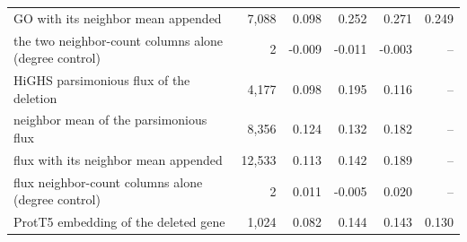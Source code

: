 \begin{table}[H]
\begin{tabular}{@{}lrrrrr@{}}
    GO with its neighbor mean appended & 7,088 & 0.098 & 0.252 & 0.271 & 0.249 \\
    the two neighbor-count columns alone (degree control) & 2 & -0.009 & -0.011 & -0.003 & -- \\
    HiGHS parsimonious flux of the deletion & 4,177 & 0.098 & 0.195 & 0.116 & -- \\
    neighbor mean of the parsimonious flux & 8,356 & 0.124 & 0.132 & 0.182 & -- \\
    flux with its neighbor mean appended & 12,533 & 0.113 & 0.142 & 0.189 & -- \\
    flux neighbor-count columns alone (degree control) & 2 & 0.011 & -0.005 & 0.020 & -- \\
    ProtT5 embedding of the deleted gene & 1,024 & 0.082 & 0.144 & 0.143 & 0.130 \\
    \hline
  \end{tabular}
\end{table}
